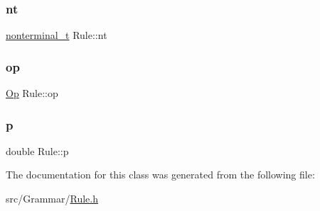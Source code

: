 \subsubsection{\texorpdfstring{nt}{nt}}
{\footnotesize\ttfamily \hyperlink{_nonterminal_8h_a1c5bfe9b903f69c83bbde5da7035fef3}{nonterminal\+\_\+t} Rule\+::nt}

\mbox{\label{class_rule_ac98be91bb7865f73af2c0589fd657153}} 
\subsubsection{\texorpdfstring{op}{op}}
{\footnotesize\ttfamily \hyperlink{_ops_8h_a588e6b56097e045c733b60d25c4d45ab}{Op} Rule\+::op}

\mbox{\label{class_rule_acd7e4d41d59dec76f60ca16238ab391a}} 
\subsubsection{\texorpdfstring{p}{p}}
{\footnotesize\ttfamily double Rule\+::p}



The documentation for this class was generated from the following file\+:\begin{DoxyCompactItemize}
\item 
src/\+Grammar/\hyperlink{_rule_8h}{Rule.\+h}\end{DoxyCompactItemize}
